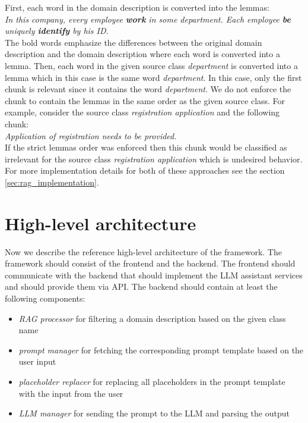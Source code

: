 \noindent{}First, each word in the domain description is converted into the lemmas: \\

\noindent{}\textit{In this company, every employee \textbf{work} in some department. Each employee \textbf{be} uniquely \textbf{identify} by his ID.} \\

\noindent{}The bold words emphasize the differences between the original domain description and the domain description where each word is converted into a lemma. Then, each word in the given source class \textit{department} is converted into a lemma which in this case is the same word \textit{department}.  In this case, only the first chunk is relevant since it contains the word \textit{department}. We do not enforce the chunk to contain the lemmas in the same order as the given source class. For example, consider the source class \textit{registration application} and the following chunk: \\

\noindent{}\textit{Application of registration needs to be provided.} \\

\noindent{}If the strict lemmas order was enforced then this chunk would be classified as irrelevant for the source class \textit{registration application} which is undesired behavior. For more implementation details for both of these approaches see the section \ref{sec:rag_implementation}.


\section{High-level architecture}
\label{sec:high_level_architecture}

Now we describe the reference high-level architecture of the framework. The framework should consist of the frontend and the backend. The frontend should communicate with the backend that should implement the LLM assistant services and should provide them via API. The backend should contain at least the following components:

\begin{itemize}
\item \emph{RAG processor} for filtering a domain description based on the given class name
\item \emph{prompt manager} for fetching the corresponding prompt template based on the user input
\item \emph{placeholder replacer} for replacing all placeholders in the prompt template with the input from the user
\item \emph{LLM manager} for sending the prompt to the LLM and parsing the output
\end{itemize}


